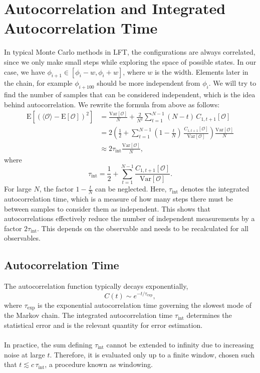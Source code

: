 \section{Autocorrelation and Integrated Autocorrelation Time}
In typical Monte Carlo methods in LFT, the configurations are always correlated, since we only make small steps while exploring the space of possible states. In our case, we have $\phi_{i+1} \in [\phi_i - w, \phi_i + w]$, where $w$ is the width. Elements later in the chain, for example $\phi_{i + 100}$ should be more independent from $\phi_i$. We will try to find the number of samples that can be considered independent, which is the idea behind autocorrelation. We rewrite the formula from above as follows: 
\begin{equation}
    \begin{aligned}
        \text{E}\left[ \left( \langle \mathcal{O} \rangle - \text{E}[\mathcal{O}] \right)^{2} \right]
        & =
        \frac{\text{Var}[\mathcal{O}]}{N} + \frac{2}{N^{2}} \sum_{t = 1}^{N - 1} (N - t) \, C_{1, t + 1}[\mathcal{O}]
        \\
        & =
        2 \left( \frac{1}{2} + \sum_{t = 1}^{N - 1} \left( 1 - \frac{t}{N}\right) \, \frac{C_{1, t + 1}[\mathcal{O}]}{\text{Var}[\mathcal{O}]} \right) \frac{\text{Var}[\mathcal{O}]}{N}
        \\
        & \approx
        2 \tau_{\text{int}} \frac{\text{Var}[\mathcal{O}]}{N},
    \end{aligned}
\end{equation}
where
\begin{equation}
    \tau_{\text{int}} = \frac{1}{2} + \sum_{t = 1}^{N - 1} \frac{C_{1, t + 1}[\mathcal{O}]}{\text{Var}[\mathcal{O}]}. 
\end{equation}
For large $N$, the factor $1 - \frac{t}{N}$ can be neglected. Here, $\tau_{\text{int}}$ denotes the integrated autocorrelation time, which is a measure of how many steps there must be between samples to consider them as independent. This shows that autocorrelations effectively reduce the number of independent measurements by a factor $2\tau_{\mathrm{int}}$. This depends on the observable and needs to be recalculated for all observables. \cite{wiki:autocorrelation}
\subsection{Autocorrelation Time}
The autocorrelation function typically decays exponentially,
\begin{equation}
    C(t) \sim e^{-t/\tau_{\mathrm{exp}}},
\end{equation}
where $\tau_{\mathrm{exp}}$ is the exponential autocorrelation time governing the slowest mode of the Markov chain. The integrated autocorrelation time $\tau_{\mathrm{int}}$ determines the statistical error and is the relevant quantity for error estimation.\\\\
In practice, the sum defining $\tau_{\mathrm{int}}$ cannot be extended to infinity due to increasing noise at large $t$. Therefore, it is evaluated only up to a finite window, chosen such that $t \lesssim c\,\tau_{\mathrm{int}}$, a procedure known as windowing.
